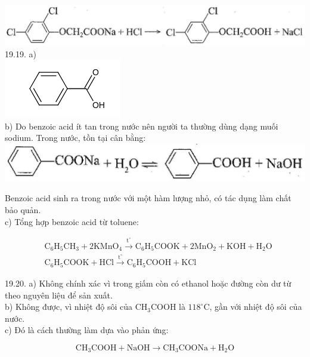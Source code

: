 \documentclass[10pt]{article}
\begin{document}
\includegraphics[max width=\textwidth, center]{2025_10_23_052d3249fabea90c1e95g-30(3)}\\
19.19. a)\\
\includegraphics{smile-582d5d3e192bbc73de3bf6a757f7824f5f613dce}\\
b) Do benzoic acid ít tan trong nước nên người ta thường dùng dạng muối sodium. Trong nước, tồn tại cân bằng:\\
\includegraphics[max width=\textwidth, center]{2025_10_23_052d3249fabea90c1e95g-30(4)}

Benzoic acid sinh ra trong nước với một hàm lượng nhỏ, có tác dụng làm chất bảo quản.\\
c) Tổng hợp benzoic acid từ toluene:

$$
\begin{aligned}
& \mathrm{C}_{6} \mathrm{H}_{5} \mathrm{CH}_{3}+2 \mathrm{KMnO}_{4} \xrightarrow{\mathrm{t}^{\circ}} \mathrm{C}_{6} \mathrm{H}_{5} \mathrm{COOK}+2 \mathrm{MnO}_{2}+\mathrm{KOH}+\mathrm{H}_{2} \mathrm{O} \\
& \mathrm{C}_{6} \mathrm{H}_{5} \mathrm{COOK}+\mathrm{HCl} \xrightarrow{\mathrm{t}^{\circ}} \mathrm{C}_{6} \mathrm{H}_{5} \mathrm{COOH}+\mathrm{KCl}
\end{aligned}
$$

19.20. a) Không chính xác vì trong giấm còn có ethanol hoặc đường còn dư từ theo nguyên liệu để sản xuất.\\
b) Không được, vì nhiệt độ sôi của $\mathrm{CH}_{3} \mathrm{COOH}$ là $118^{\circ} \mathrm{C}$, gần với nhiệt độ sôi của nước.\\
c) Đó là cách thường làm dựa vào phản ứng:

$$
\mathrm{CH}_{3} \mathrm{COOH}+\mathrm{NaOH} \longrightarrow \mathrm{CH}_{3} \mathrm{COONa}+\mathrm{H}_{2} \mathrm{O}
$$
\end{document}
